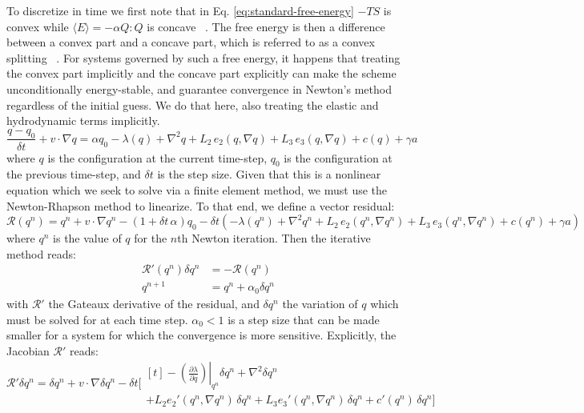 \documentclass[reqno]{article}
\begin{document}
  To discretize in time we first note that in Eq. \eqref{eq:standard-free-energy}
  $-TS$ is convex while $\langle E \rangle = -\alpha Q:Q$ is
  concave ~\cite{schimming_numerical_2021}.
  The free energy is then a difference between a convex part and a concave part,
  which is referred to as a convex splitting ~\cite{xu_stability_2019}.
  For systems governed by such a free energy, it happens that treating the
  convex part implicitly and the concave part explicitly can make the scheme
  unconditionally energy-stable, and guarantee convergence in Newton's method
  regardless of the initial guess.
  We do that here, also treating the elastic and hydrodynamic terms implicitly.
  \begin{equation}
    \frac{q - q_0}{\delta t}
    + v \cdot \nabla q
    =
    \alpha q_0
    - \lambda(q)
    + \nabla^2 q
    + L_2 \, e_2(q, \nabla q)
    + L_3 \, e_3(q, \nabla q)
    + c(q)
    + \gamma a
  \end{equation}
  where $q$ is the configuration at the current time-step, $q_0$ is the
  configuration at the previous time-step, and $\delta t$ is the step size.
  Given that this is a nonlinear equation which we seek to solve via a finite
  element method, we must use the Newton-Rhapson method to linearize.
  To that end, we define a vector residual:
  \begin{equation} \label{eq:simulation-residual}
    \mathcal{R}(q^n)
    =
    q^n + v \cdot \nabla q^n
    - (1 + \delta t \, \alpha) q_0
    - 
    \delta t \left(
      -\lambda(q^n)
      + \nabla^2 q^n
      + L_2 \, e_2(q^n, \nabla q^n)
      + L_3 \, e_3(q^n, \nabla q^n)
      + c(q^n)
      + \gamma a
    \right)
  \end{equation}
  where $q^n$ is the value of $q$ for the $n$th Newton iteration.
  Then the iterative method reads:
  \begin{equation}
    \begin{split}
      \mathcal{R}'(q^n) \delta q^n &= -\mathcal{R}(q^n) \\
      q^{n + 1} &= q^n + \alpha_0 \delta q^n
    \end{split}
  \end{equation}
  with $\mathcal{R}'$ the Gateaux derivative of the residual, and $\delta q^n$
  the variation of $q$ which must be solved for at each time step.
  $\alpha_0 < 1$ is a step size that can be made smaller for a system for which
  the convergence is more sensitive.
  Explicitly, the Jacobian $\mathcal{R}'$ reads:
  \begin{equation}
    \mathcal{R}' \delta q^n
    =
      \delta q^n
      + v \cdot \nabla \delta q^n
      -\delta t \biggl[
      \begin{multlined}[t]
        - \left. \left( \frac{\partial \lambda}{\partial q} \right) \right|_{q^n} \delta q^n
        + \nabla^2 \delta q^n \\
        + L_2 e_2'(q^n, \nabla q^n) \, \delta q^n
        + L_3 e_3'(q^n, \nabla q^n) \, \delta q^n
        + c'(q^n) \, \delta q^n
      \biggr]
    \end{multlined}
  \end{equation}
\end{document}
